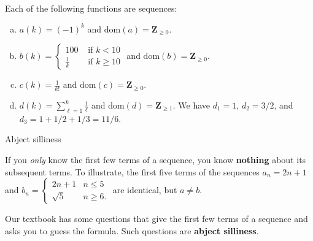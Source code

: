 \documentclass[portrait,fleqn,12pt]{beamer}
\newcommand{\dom}{\mbox{dom}}
\newenvironment{alphalist}
   {\begin{enumerate}[(a)]
       \addtolength{\itemsep}{-1.25\itemsep}}
     {\end{enumerate}}
\newcommand{\integers}{\mathbf{Z}}
\begin{document}
\begin{frame}

\begin{example} Each of the following functions are sequences:

\begin{alphalist}
\item \(a(k)  = (-1)^k \) and $\dom(a)=\integers_{\geq 0}$.

\item \(\displaystyle b(k) = \begin{cases} 100 & \mbox{ if } k <
    10 \\ \frac{1}{k} & \mbox{ if } k \geq 10 \end{cases} \)  and $\dom(b)=\integers_{\geq 0}$.

\item  \(\displaystyle c(k) = \frac{1}{k!} \) and $\dom(c)=\integers_{\geq 0}$. 

\item  \(\displaystyle d(k)  = \sum_{\ell=1}^k \frac{1}{\ell}\) and  $\dom(d)=\integers_{\geq 1}$. We have
\(d_1 = 1\), \(d_2 = 3/2\), and \(d_3 = 1+1/2 + 1/3 = 11/6\).


\end{alphalist}
\end{example}

\end{frame}
\begin{frame}{Abject silliness}


If you \emph{only} know the first few terms of a sequence, you know
\textbf{nothing} about its subsequent terms. To illustrate, the first five
terms of the sequences
\(
  a_n = 2 n + 1
\)
and
\(
  b_n = \begin{cases} 2 n +1 & n \leq 5 \\  \sqrt{5} & n \geq 6. \end{cases}
\)
are identical, but \(a \neq b\). 

Our textbook has some questions that give the first few terms of a sequence and
asks you to guess the formula. Such questions are \textbf{abject silliness}.

\end{frame}
\end{document}
